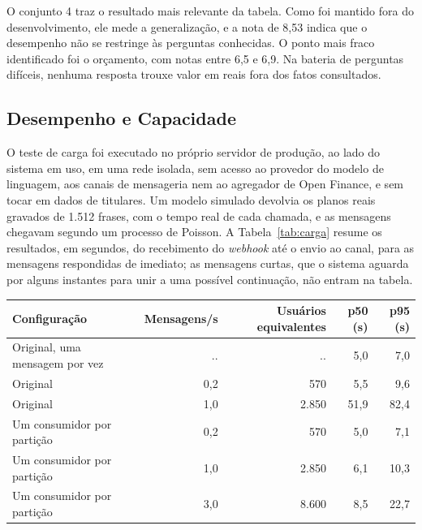 O conjunto 4 traz o resultado mais relevante da tabela. Como foi mantido fora do desenvolvimento, ele mede a generalização, e a nota de 8,53 indica que o desempenho não se restringe às perguntas conhecidas. O ponto mais fraco identificado foi o orçamento, com notas entre 6,5 e 6,9. Na bateria de perguntas difíceis, nenhuma resposta trouxe valor em reais fora dos fatos consultados.

\subsection{Desempenho e Capacidade}

O teste de carga foi executado no próprio servidor de produção, ao lado do sistema em uso, em uma rede isolada, sem acesso ao provedor do modelo de linguagem, aos canais de mensageria nem ao agregador de Open Finance, e sem tocar em dados de titulares. Um modelo simulado devolvia os planos reais gravados de 1.512 frases, com o tempo real de cada chamada, e as mensagens chegavam segundo um processo de Poisson. A Tabela~\ref{tab:carga} resume os resultados, em segundos, do recebimento do \textit{webhook} até o envio ao canal, para as mensagens respondidas de imediato; as mensagens curtas, que o sistema aguarda por alguns instantes para unir a uma possível continuação, não entram na tabela.

\begin{tabela}[H]
\centering
\caption{Latência no teste de carga antes e depois da mudança de consumidores}
\label{tab:carga}
{\small
\begin{tabular}{lrrrr}
\toprule
\textbf{Configuração} & \textbf{Mensagens/s} & \textbf{Usuários equivalentes} & \textbf{p50 (s)} & \textbf{p95 (s)} \\
\midrule
Original, uma mensagem por vez & .. & .. & 5,0 & 7,0 \\
Original & 0,2 & 570 & 5,5 & 9,6 \\
Original & 1,0 & 2.850 & 51,9 & 82,4 \\
Um consumidor por partição & 0,2 & 570 & 5,0 & 7,1 \\
Um consumidor por partição & 1,0 & 2.850 & 6,1 & 10,3 \\
Um consumidor por partição & 3,0 & 8.600 & 8,5 & 22,7 \\
\bottomrule
\end{tabular}
}
\authorssource
\end{tabela}

